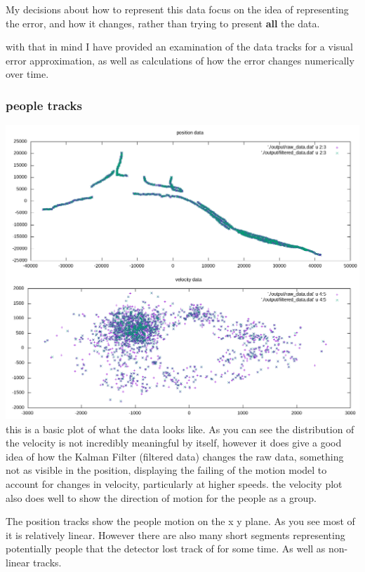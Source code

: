 \documentclass[10pt,a4paper]{article}
\begin{document}
My decisions about how to represent this data focus on the idea of representing the error, and how it changes, rather than trying to present \textbf{all} the data.

with that in mind I have provided an examination of the data tracks for a visual error approximation, as well as calculations of how the error changes numerically over time.

\subsubsection{people tracks}
\includegraphics[width=\textwidth]{../graphs/raw_data.png}\\

this is a basic plot of what the data looks like. As you can see the distribution of the velocity is not incredibly meaningful by itself, however it does give a good idea of how the Kalman Filter (filtered data) changes the raw data, something not as visible in the position, displaying the failing of the motion model to account for changes in velocity, particularly at higher speeds. the velocity plot also does well to show the direction of motion for the people as a group.

The position tracks show the people motion on the x y plane. As you see most of it is relatively linear. However there are also many short segments representing potentially people that the detector lost track of for some time. As well as non-linear tracks.
\end{document}
